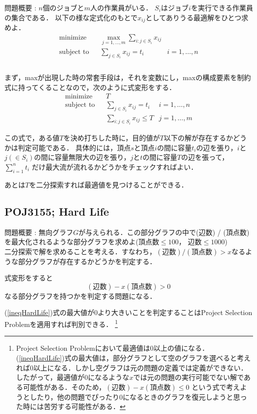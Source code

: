 \documentclass[13pt]{jarticle}
\theoremstyle{nonitalic} %
\begin{document}
問題概要 : $n$個のジョブと$m$人の作業員がいる．
$S_i$はジョブ$i$を実行できる作業員の集合である．
以下の様な定式化のもとで$x_{ij}$としてありうる最適解をひとつ求めよ．
\begin{align}
  &&&&& \textrm{minimize}   && \max_{j=1,\dots,m} \sum_{i:j \in S_i} x_{ij} \\
  &&&&& \textrm{subject to} && \sum_{j \in S_i} x_{ij} = t_i  & i=1,\dots,n &&&&&\\
\end{align}\\


まず，maxが出現した時の常套手段は，それを変数にし，maxの構成要素を制約式に持ってくることなので，次のように式変形をする．
\begin{align}
  &&&&& \textrm{minimize}   && T \\
  &&&&& \textrm{subject to} && \sum_{j \in S_i} x_{ij} = t_i  & i=1,\dots,n &&&&&\\
  &&&&&                     &&  \sum_{i:j \in S_i} x_{ij} \leq T & j=1,\dots,m
\end{align}

この式で，ある値$T$を決め打ちした時に，目的値が$T$以下の解が存在するかどうかは判定可能である． 具体的には，頂点$s$と頂点$i$の間に容量$t_i$の辺を張り，$i$と$j (\in S_i)$の間に容量無限大の辺を張り，$j$と$t$の間に容量$T$の辺を張って，$\sum_{i=1}^n t_i $ だけ最大流が流れるかどうかをチェックすればよい．

あとは$T$を二分探索すれば最適値を見つけることができる．


\subsection{POJ3155; Hard Life}
\label{prob:hardlife}
問題概要 : 無向グラフ$G$が与えられる．この部分グラフの中で(辺数) / (頂点数)を最大化されるような部分グラフを求めよ(頂点数$\leq 100$， 辺数$\leq 1000$)\\

二分探索で解を求めることを考える．すなわち，$ (\textrm{辺数}) / (\textrm{頂点数})  > x$なるような部分グラフが存在するかどうかを判定する．

式変形をすると
\begin{equation}
  (\textrm{辺数}) - x (\textrm{頂点数}) > 0 \label{ineqHardLife}
\end{equation}
なる部分グラフを持つかを判定する問題になる．

(\ref{ineqHardLife})式の最大値が$0$より大きいことを判定することはProject Selection Problemを適用すれば判別できる． \footnote{ Project Selection Problemにおいて最適値は$0$以上の値になる．(\ref{ineqHardLife})式の最大値は，部分グラフとして空のグラフを選べると考えれば$0$以上になる．しかし空グラフは元の問題の定義では定義ができない．したがって，最適値が$0$になるような$x$では元の問題の実行可能でない解である可能性がある．そのため，$ (\textrm{辺数}) - x (\textrm{頂点数}) \leq 0 $  という式で考えようとしたり，他の問題でぴったり$0$になるときのグラフを復元しようと思った時には苦労する可能性がある．}
\end{document}
